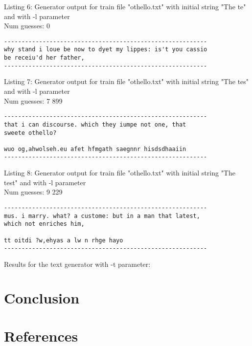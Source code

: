 \documentclass{article}
\begin{document}
Listing 6: Generator output for train file "othello.txt" with initial string "The te" and with -l parameter
\\Num guesses: 0

\begin{lstlisting}
----------------------------------------------------------
why stand i loue be now to dyet my lippes: is't you cassio 
be receiu'd her father,
----------------------------------------------------------
\end{lstlisting}

Listing 7: Generator output for train file "othello.txt" with initial string "The tes" and with -l parameter
\\Num guesses: 7 899

\begin{lstlisting}
----------------------------------------------------------
that i can discourse. which they iumpe not one, that 
sweete othello?

wuo og,ahwolseh.eu afet hfmgath saegnnr hisdsdhaaiin
----------------------------------------------------------
\end{lstlisting}

Listing 8: Generator output for train file "othello.txt" with initial string "The test" and with -l parameter
\\Num guesses: 9 229

\begin{lstlisting}
----------------------------------------------------------
mus. i marry. what? a custome: but in a man that latest, 
which not enriches him,

tt oitdi ?w,ehyas a lw n rhge hayo
----------------------------------------------------------
\end{lstlisting}



Results for the text generator with -t parameter:


\hfill

    

\section{Conclusion}
\label{sec:conclusion}


\section{References}


\end{document}
